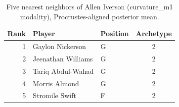 \begin{table}[htbp]
  \centering\small
  \begin{tabular}{rllc}
    \toprule
    Rank & Player & Position & Archetype \\
    \midrule
    1 & Gaylon Nickerson & G & 2 \\
    2 & Jeenathan Williams & G & 2 \\
    3 & Tariq Abdul-Wahad & G & 2 \\
    4 & Morris Almond & G & 2 \\
    5 & Stromile Swift & F & 2 \\
    \bottomrule
  \end{tabular}
  \caption{Five nearest neighbors of Allen Iverson (curvature_m1 modality), Procrustes-aligned posterior mean.}
  \label{tab:Allen_Iverson_neighbors_curvature_m1}
\end{table}

